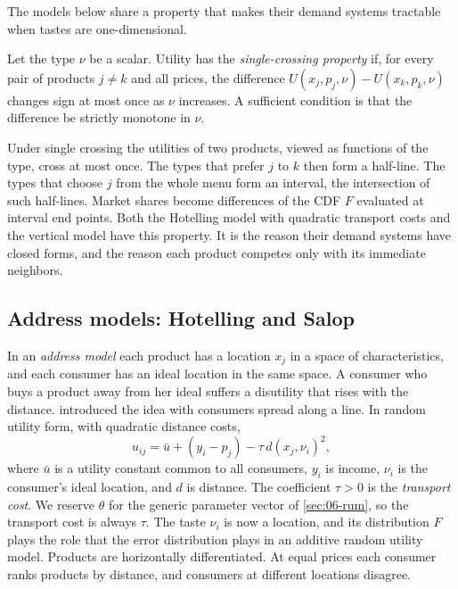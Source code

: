 The models below share a property that makes their demand systems tractable when tastes are
one-dimensional.

\begin{definition}\label{def:06-singlecrossing}
Let the type $\nu$ be a scalar. Utility has the \emph{single-crossing property} if, for every pair of
products $j \ne k$ and all prices, the difference $U(x_j, p_j, \nu) - U(x_k, p_k, \nu)$ changes sign at
most once as $\nu$ increases. A sufficient condition is that the difference be strictly monotone in $\nu$.
\end{definition}

Under single crossing the utilities of two products, viewed as functions of the type, cross at most once.
The types that prefer $j$ to $k$ then form a half-line. The types that choose $j$ from the whole menu
form an interval, the intersection of such half-lines. Market shares become differences of the CDF $F$
evaluated at interval end points. Both the Hotelling model with quadratic transport costs and the
vertical model have this property. It is the reason their demand systems have closed forms, and the
reason each product competes only with its immediate neighbors.

\subsection{Address models: Hotelling and Salop}\label{sec:06-hotelling}

In an \emph{address model} each product has a location $x_j$ in a space of characteristics, and each
consumer has an ideal location in the same space. A consumer who buys a product away from her ideal
suffers a disutility that rises with the distance. \citet{Hotelling1929} introduced the idea with
consumers spread along a line. In random utility form, with quadratic distance costs,
\begin{equation}\label{eq:06-hotelling-u}
  u_{ij} = \bar u + (y_i - p_j) - \tau\, d(x_j, \nu_i)^2,
\end{equation}
where $\bar u$ is a utility constant common to all consumers, $y_i$ is income, $\nu_i$ is the consumer's
ideal location, and $d$ is distance. The coefficient $\tau > 0$ is the \emph{transport cost}. We reserve
$\theta$ for the generic parameter vector of \cref{sec:06-rum}, so the transport cost is always $\tau$.
The taste $\nu_i$ is now a location, and its distribution $F$ plays the role that the error distribution
plays in an additive random utility model. Products are horizontally differentiated. At equal prices
each consumer ranks products by distance, and consumers at different locations disagree.

